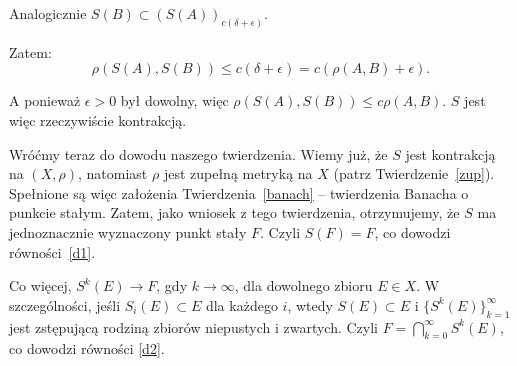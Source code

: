\documentclass{mini}
\begin{document}
\begin{dow1}
\begin{dow}
Analogicznie $S(B) \subset \left(S(A)\right)_{c(\delta+\epsilon)}$.

Zatem: 
$$
\rho\left(S(A),S(B)\right)\leqslant c(\delta+\epsilon) = c(\rho(A,B)+\epsilon).
$$

A ponieważ $\epsilon>0$ był dowolny, więc $\rho\left(S(A),S(B)\right)\leqslant c\rho(A,B)$. $S$ jest więc rzeczywiście kontrakcją.

\end{dow}

Wróćmy teraz do dowodu naszego twierdzenia.
Wiemy już, że $S$ jest kontrakcją na $(X,\rho)$, natomiast $\rho$ jest zupełną metryką na $X$ (patrz Twierdzenie~\ref{zup}). Spełnione są więc założenia Twierdzenia~\ref{banach} -- twierdzenia Banacha o punkcie stałym.
Zatem, jako wniosek z tego twierdzenia, otrzymujemy, że $S$ ma jednoznacznie wyznaczony punkt stały $F$. Czyli $S(F)=F$, co dowodzi równości~\eqref{d1}.

Co więcej, $S^k(E)\longrightarrow F$, gdy $k\longrightarrow\infty$, dla dowolnego zbioru $E \in X$. W szczególności, jeśli $S_i(E) \subset E$ dla każdego $i$, wtedy $S(E) \subset E$ i $\lbrace S^k(E)\rbrace^{\infty}_{k=1}$ jest zstępującą rodziną zbiorów niepustych i zwartych. Czyli $F = \bigcap^{\infty}_{k=0} S^k(E)$, co dowodzi równości \eqref{d2}.

\end{dow1}
\end{document}
